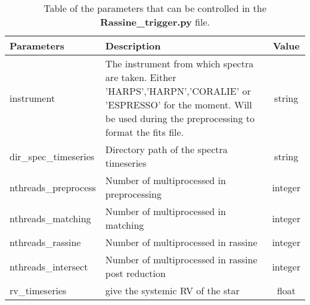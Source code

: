 \documentclass[10pt]{article}
\begin{document}
\begin{table}
	\caption{Table of the parameters that can be controlled in the \textbf{Rassine\_trigger.py} file.\newline}             %
	\label{table:2}      %
	\centering                          %
	\begin{tabular}{| l | p{80mm}| c |}        %
		\hline                 %
		Parameters & Description & Value \\    %
		\hline                        %
		instrument & The instrument from which spectra are taken. Either 'HARPS','HARPN','CORALIE' or 'ESPRESSO' for the moment. Will be used during the preprocessing to format the fits file. & string \\ \hline      %
		dir\_spec\_timeseries & Directory path of the spectra timeseries & string \\ \hline 
		nthreads\_preprocess  & Number of multiprocessed in preprocessing & integer  \\ \hline 
		nthreads\_matching  & Number of multiprocessed in matching  & integer  \\ \hline 
		nthreads\_rassine  & Number of multiprocessed in rassine  & integer  \\ \hline 
		nthreads\_intersect  & Number of multiprocessed in rassine post reduction & integer  \\ \hline 
		rv\_timeseries  & give the systemic RV of the star & float \\ \hline 
		

\end{tabular}
\end{table}
\end{document}
